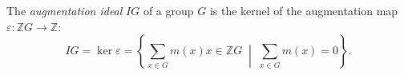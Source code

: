 The \emph{augmentation ideal} $IG$ of a group $G$ is the kernel of the augmentation map $\varepsilon: \mathbb{Z}G \to \mathbb{Z}$:
$$IG = \ker \varepsilon = \left\{ \sum_{x \in G} m(x) x \in \mathbb{Z}G \;\middle|\; \sum_{x \in G} m(x) = 0 \right\}.$$
